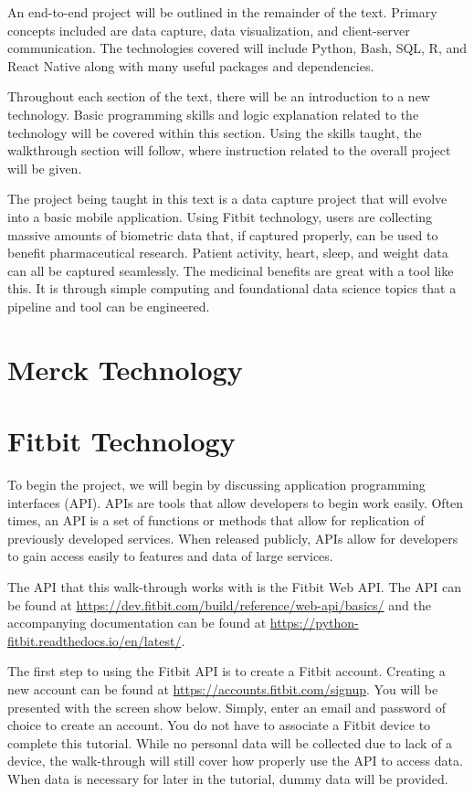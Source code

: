 \documentclass[]{book}
\begin{document}
An end-to-end project will be outlined in the remainder of the text.
Primary concepts included are data capture, data visualization, and
client-server communication. The technologies covered will include
Python, Bash, SQL, R, and React Native along with many useful packages
and dependencies.

Throughout each section of the text, there will be an introduction to a
new technology. Basic programming skills and logic explanation related
to the technology will be covered within this section. Using the skills
taught, the walkthrough section will follow, where instruction related
to the overall project will be given.

The project being taught in this text is a data capture project that
will evolve into a basic mobile application. Using Fitbit technology,
users are collecting massive amounts of biometric data that, if captured
properly, can be used to benefit pharmaceutical research. Patient
activity, heart, sleep, and weight data can all be captured seamlessly.
The medicinal benefits are great with a tool like this. It is through
simple computing and foundational data science topics that a pipeline
and tool can be engineered.

\chapter{Merck Technology}\label{merck-technology}

\chapter{Fitbit Technology}\label{fitbit-technology}

To begin the project, we will begin by discussing application
programming interfaces (API). APIs are tools that allow developers to
begin work easily. Often times, an API is a set of functions or methods
that allow for replication of previously developed services. When
released publicly, APIs allow for developers to gain access easily to
features and data of large services.

The API that this walk-through works with is the Fitbit Web API. The API
can be found at
\url{https://dev.fitbit.com/build/reference/web-api/basics/} and the
accompanying documentation can be found at
\url{https://python-fitbit.readthedocs.io/en/latest/}.

The first step to using the Fitbit API is to create a Fitbit account.
Creating a new account can be found at
\url{https://accounts.fitbit.com/signup}. You will be presented with the
screen show below. Simply, enter an email and password of choice to
create an account. You do not have to associate a Fitbit device to
complete this tutorial. While no personal data will be collected due to
lack of a device, the walk-through will still cover how properly use the
API to access data. When data is necessary for later in the tutorial,
dummy data will be provided.
\end{document}
